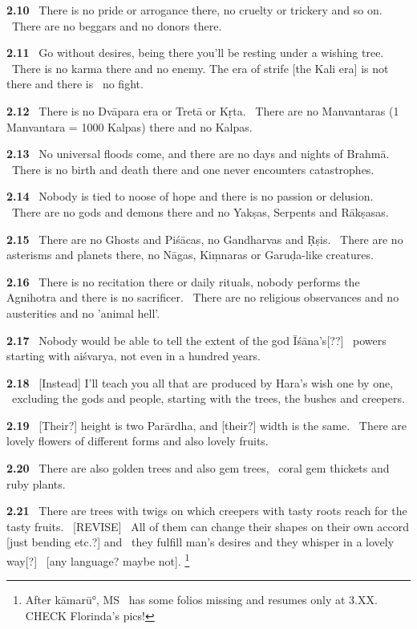 \documentclass{article}
\begin{document}
\textbf{2.10}%
\ There is no pride or arrogance there, no cruelty or trickery and so on.%
\              There are no beggars and no donors there.%


\textbf{2.11}%
\ Go without desires, being there you'll be resting under a wishing tree.%
\              There is no karma there and no enemy. The era of strife [the Kali era] is not there and there is%
\                 no fight.%


\textbf{2.12}%
\ There is no Dvāpara era or Tretā or Kṛta.%
\              There are no Manvantaras (1 Manvantara = 1000 Kalpas) there and no Kalpas.%


\textbf{2.13}%
\ No universal floods come, and there are no days and nights of Brahmā.%
\              There is no birth and death there and one never encounters catastrophes.%


\textbf{2.14}%
\ Nobody is tied to noose of hope and there is no passion or delusion.%
\              There are no gods and demons there and no Yakṣas, Serpents and Rākṣasas.%


\textbf{2.15}%
\ There are no Ghosts and Piśācas, no Gandharvas and Ṛṣis.%
\              There are no asterisms and planets there, no Nāgas, Kiṃnaras or Garuḍa-like creatures.%


\textbf{2.16}%
\ There is no recitation there or daily rituals, nobody performs the Agnihotra and there is no sacrificer.%
\              There are no religious observances and no austerities and no 'animal hell'.%


\textbf{2.17}%
\ Nobody would be able to tell the extent of the god Īśāna's[??]%
\      powers starting with aiśvarya, not even in a hundred years.%


\textbf{2.18}%
\ [Instead] I'll teach you all that are produced by Hara's wish one by one,%
\              excluding the gods and people, starting with the trees, the bushes and creepers.%


\textbf{2.19}%
\ [Their?] height is two Parārdha, and [their?] width is the same.%
\              There are lovely flowers of different forms and also lovely fruits.%


\textbf{2.20}%
\ There are also golden trees and also gem trees,%
\              coral gem thickets and ruby plants.%


\textbf{2.21}%
\ There are trees with twigs on which creepers with tasty roots reach for the tasty fruits.%
\      [REVISE]%
\              All of them can change their shapes on their own accord [just bending etc.?] and%
\                         they fulfill man's desires and they whisper in a lovely way[?]%
\                         [any language? maybe not].%
\footnote{After kāmarū°, MS \msCc\ has some folios missing and resumes only at 3.XX. CHECK Florinda's pics! }%
\end{document}
